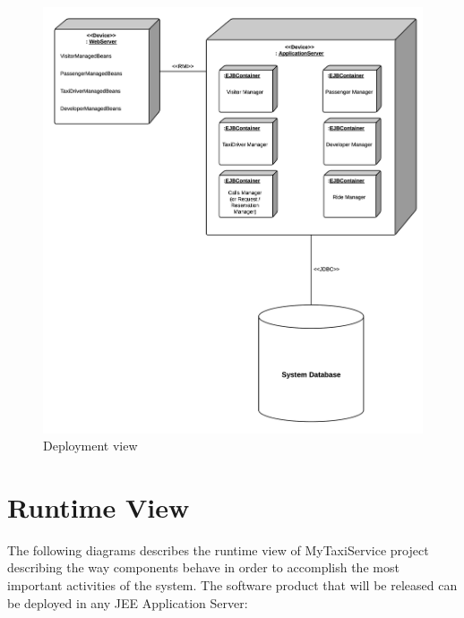\begin{figure}[htbp]
\centering
\includegraphics[width=\textwidth]{cpt/img/RuntimeDeploymentView}
\caption{Deployment view}
\label{fig:Deploy}
\end{figure}
\clearpage

\section{Runtime View}
The following diagrams describes the runtime view of MyTaxiService project describing the way components behave in order to accomplish the most important activities of the system. The software product that will be released can be deployed in any JEE Application Server:

